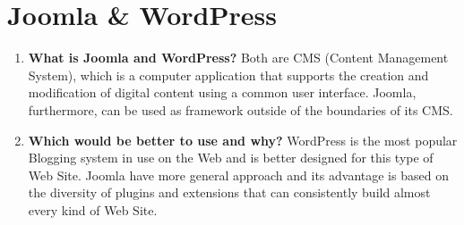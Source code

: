 \chapter{Joomla \& WordPress}
	\begin{enumerate}
		\item{\textbf{What is Joomla and WordPress?} Both are CMS (Content Management System), which is a computer application that supports the creation and modification of digital content using a common user interface. Joomla, furthermore, can be used as framework outside of the boundaries of its CMS.}
		\item{\textbf{Which would be better to use and why?} WordPress is the most popular Blogging system in use on the Web and is better designed for this type of Web Site. Joomla have more general approach and its advantage is based on the diversity of plugins and extensions that can consistently build almost every kind of Web Site.}
	\end{enumerate}

